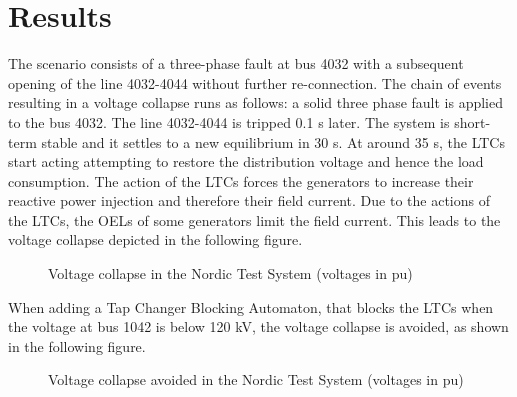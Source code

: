 \documentclass[a4paper, 12pt]{report}
\begin{document}
\section{Results}

The scenario consists of a three-phase fault at bus 4032 with a subsequent opening of the line 4032-4044 without further re-connection.
The chain of events resulting in a voltage collapse runs as follows: a solid three phase fault is applied to the bus 4032. The line 4032-4044 is tripped 0.1 s later. The system is short-term stable and it settles to a new equilibrium in 30 s. At around 35 s, the LTCs start acting attempting to restore the distribution voltage and hence the load consumption. The action of the LTCs forces the generators to increase their reactive power injection and therefore their field current. Due to the actions of the LTCs, the OELs of some generators limit the field current. This leads to the voltage collapse depicted in the following figure.

\begin{figure}[H]
\caption{Voltage collapse in the Nordic Test System (voltages in pu)}
\end{figure}

When adding a Tap Changer Blocking Automaton, that blocks the LTCs when the voltage at bus 1042 is below 120 kV, the voltage collapse is avoided, as shown in the following figure.

\begin{figure}[H]
\caption{Voltage collapse avoided in the Nordic Test System (voltages in pu)}
\end{figure}
\end{document}
